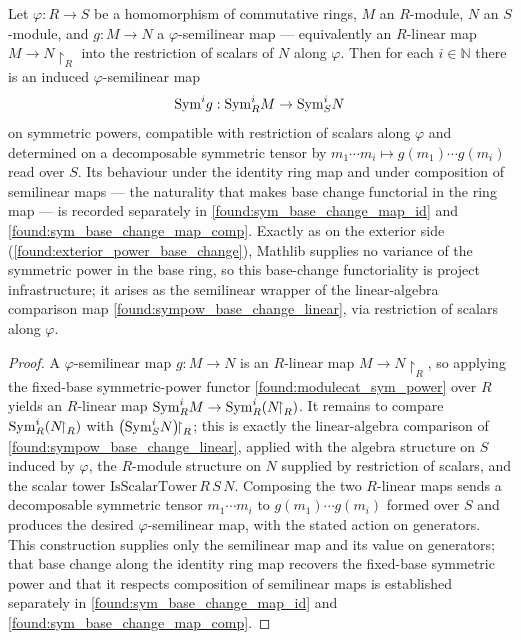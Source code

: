 \begin{lemma}
  \label{found:sym_power_base_change}
  Let \(\varphi:R\to S\) be a homomorphism of commutative rings, \(M\) an
  \(R\)-module, \(N\) an \(S\)-module, and \(g:M\to N\) a \(\varphi\)-semilinear
  map --- equivalently an \(R\)-linear map \(M\to N{\restriction}_R\) into the
  restriction of scalars of \(N\) along \(\varphi\).  Then for each
  \(i\in\mathbb N\) there is an induced \(\varphi\)-semilinear map
  \[
    \mathrm{Sym}^i g:\mathrm{Sym}^i_R M\to\mathrm{Sym}^i_S N
  \]
  on symmetric powers, compatible with restriction of scalars along \(\varphi\)
  and determined on a decomposable symmetric tensor by
  \(m_1\cdots m_i\mapsto g(m_1)\cdots g(m_i)\) read over \(S\).  Its behaviour
  under the identity ring map and under composition of semilinear maps --- the
  naturality that makes base change functorial in the ring map --- is recorded
  separately in \cref{found:sym_base_change_map_id} and
  \cref{found:sym_base_change_map_comp}.  Exactly as on the exterior side
  (\cref{found:exterior_power_base_change}), Mathlib supplies no variance of the
  symmetric power in the base ring, so this base-change functoriality is project
  infrastructure; it arises as the semilinear wrapper of the linear-algebra comparison
  map \cref{found:sympow_base_change_linear}, via restriction of scalars along \(\varphi\).
\end{lemma}

\begin{proof}
  \leanok
  A \(\varphi\)-semilinear map \(g:M\to N\) is an \(R\)-linear map
  \(M\to N{\restriction}_R\), so applying the fixed-base symmetric-power functor
  \cref{found:modulecat_sym_power} over \(R\) yields an \(R\)-linear map
  \(\mathrm{Sym}^i_R M\to\mathrm{Sym}^i_R(N{\!\upharpoonright}_R)\).  It remains to compare
  \(\mathrm{Sym}^i_R(N{\!\upharpoonright}_R)\) with \(\bigl(\mathrm{Sym}^i_S N\bigr){\!\upharpoonright}_R\);
  this is exactly the linear-algebra comparison of
  \cref{found:sympow_base_change_linear}, applied with the algebra structure on
  \(S\) induced by \(\varphi\), the \(R\)-module structure on \(N\) supplied by
  restriction of scalars, and the scalar tower \(\mathrm{IsScalarTower}\,R\,S\,N\).
  Composing the two \(R\)-linear maps sends a decomposable symmetric tensor
  \(m_1\cdots m_i\) to
  \(g(m_1)\cdots g(m_i)\) formed over \(S\) and produces the desired
  \(\varphi\)-semilinear map, with the stated action on generators.  This
  construction supplies only the semilinear map and its value on generators; that
  base change along the identity ring map recovers the fixed-base symmetric power
  and that it respects composition of semilinear maps is established separately in
  \cref{found:sym_base_change_map_id} and \cref{found:sym_base_change_map_comp}.
\end{proof}


